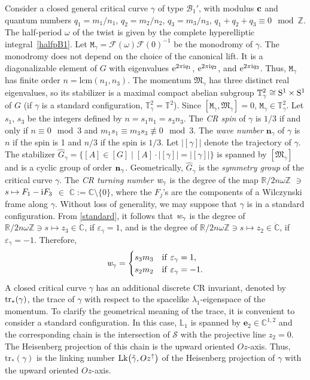 \documentclass[10pt,a4paper]{amsart}
\numberwithin{equation}{section}
\def\C{\mathbb{C}}
\def\R{\mathbb{R}}
\def\Z{\mathbb{Z}}
\def\S{\mathcal{S}}
\def\S{\mathcal{S}}
\begin{document}
Consider a closed general critical curve $\gamma$ of type ${\mathcal B}_1'$,
with modulus ${\bf c}$
and quantum numbers $q_1=m_1/n_1$, $q_2=m_2/n_2$, $q_3=m_3/n_3$, $q_1+q_2+q_3\equiv 0 \mod \Z$.
The half-period $\omega$ of the twist is given by the complete hyperelliptic integral~\eqref{halfpB1}.
Let
${\mathtt M}_{\gamma}={\mathcal F}(\omega){\mathcal F}(0)^{-1}$ be the monodromy of $\gamma$.
The monodromy does not depend on the choice of the canonical lift.
It is a diagonalizable element of ${G}$ with eigenvalues ${\rm e}^{2\pi {\rm i} q_1}$, ${\rm e}^{2\pi {\rm i} q_2}$, and ${\rm e}^{2\pi {\rm i} q_3}$.
Thus, ${\mathtt M}_{\gamma}$ has finite order $n=\mathrm{lcm}(n_1,n_3)$.
The momentum ${\mathfrak M}_{\gamma}$ has three distinct real eigenvalues,
so its stabilizer is a maximal compact abelian subgroup ${\mathbb T}^2_{\gamma}\cong {\rm S}^1\times {\rm S}^1$ of ${G}$
\big(if $\gamma$ is a standard configuration, ${\mathbb T}^2_{\gamma}={\mathbb T}^2$\big).
Since $[{\mathtt M}_{\gamma},{\mathfrak M}_{\gamma}]=0$, ${\mathtt M}_{\gamma}\in {\mathbb T}^2_{\gamma}$.
Let $s_1$, $s_3$ be the integers defined by $n=s_1n_1=s_3n_3$. The \textit{CR spin} of $\gamma$ is $1/3$ if and only if
$n\equiv 0 \mod 3$ and $m_1s_1\equiv m_3s_3\not\equiv 0 \mod 3$.
The \textit{wave number} $\mathbf{n}_{\gamma}$ of $\gamma$ is $n$ if the spin is 1 and $n/3$ if the spin is $1/3$.
Let $|[\gamma]|$ denote the trajectory of $\gamma$.
The stabilizer $\hat{{G}}_{\gamma}=\{[A]\in [{G}]\mid [{A}]\cdot |[\gamma]| = |[\gamma]|\}$ is spanned by
$[{\mathfrak M}_{\gamma}]$ and is a cyclic group of order ${\bf n}_{\gamma}$.
Geometrically, $\hat{{G}}_{\gamma}$ is the \emph{symmetry group} of the critical curve $\gamma$.
The \textit{CR turning number} ${\it w}_{\gamma}$ is the degree of the map
$\R/2n\omega \Z$ $\ni$ $s\mapsto F_1-{\rm i} F_3$ $\in$ $\dot{\C} := \mathbb{C}\setminus \{0\}$,
where the $F_j$'s
are the components of a Wilczynski
frame
along $\gamma$.
Without loss of generality, we may suppose that $\gamma$ is in a standard configuration. From
\eqref{standard}, it follows that ${\it w}_{\gamma}$ is the degree of
$ \R/2n\omega \Z\ni s\mapsto z_3\in \dot{\C}$, if $\varepsilon_\gamma = 1$,
and is the degree of
$ \R/2n\omega \Z\ni s\mapsto z_2\in \dot{\C}$, if $\varepsilon_\gamma = -1$.
Therefore,
\[
 {\it w}_{\gamma}=
 \begin{cases} s_3m_3 & {\rm if}\ \varepsilon_{\gamma}=1,\\
 s_2m_2 & {\rm if}\ \varepsilon_{\gamma}=-1.
 \end{cases}
 \]
A closed critical curve $\gamma$ has an additional discrete CR invariant, denoted by ${\rm tr}_*(\gamma)$,
the trace of $\gamma$ with respect to
the spacelike $\lambda_1$-eigenspace of the momentum.
To clarify the geometrical meaning of the trace, it is convenient to consider a standard configuration.
In this case, ${\mathbb L}_1$ is spanned by $\mathbf{e}_2\in \C^{1,2}$
and the corresponding chain is the intersection of $\S$ with the projective line $z_2=0$. The Heisenberg projection
of this chain is the upward oriented $Oz$-axis. Thus, $\mathrm{tr}_*(\gamma)$ is the linking number ${\rm Lk}\big(\check{\gamma},Oz^{\uparrow}\big)$ of the Heisenberg projection of $\gamma$ with the upward oriented $Oz$-axis.
\end{document}
